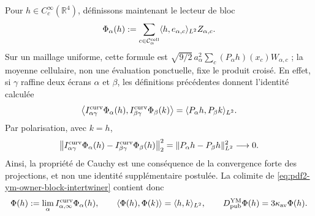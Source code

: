 Pour $h\in C_c^\infty(\mathbb R^4)$, définissons maintenant le lecteur de bloc
\begin{equation}\label{eq:pdf2-ym-owner-smeared-witness}
 \Phi_\alpha(h):=
 \sum_{c\in\mathcal C_\alpha^{\rm cell}}
 \langle h,e_{\alpha,c}\rangle_{L^2}Z_{\alpha,c}.
\end{equation}
Sur un maillage uniforme, cette formule est
$\sqrt{9/2}\,a_\alpha^2\sum_c(P_\alpha h)(x_c)W_{\alpha,c}$ ; la moyenne cellulaire,
non une évaluation ponctuelle, fixe le produit croisé. En effet, si $\gamma$ raffine
deux écrans $\alpha$ et $\beta$, les définitions précédentes donnent l’identité
calculée
\begin{equation}\label{eq:pdf2-ym-owner-smeared-cross-gram}
 \left\langle
  I_{\alpha\gamma}^{\rm curv}\Phi_\alpha(h),
  I_{\beta\gamma}^{\rm curv}\Phi_\beta(k)
 \right\rangle
 =\langle P_\alpha h,P_\beta k\rangle_{L^2}.
\end{equation}
Par polarisation, avec $k=h$,
\begin{equation}\label{eq:pdf2-ym-owner-smeared-cauchy-derived}
 \left\|
  I_{\alpha\gamma}^{\rm curv}\Phi_\alpha(h)
  -I_{\beta\gamma}^{\rm curv}\Phi_\beta(h)
 \right\|_2^2
 =\|P_\alpha h-P_\beta h\|_{L^2}^2\longrightarrow0.
\end{equation}
Ainsi, la propriété de Cauchy est une conséquence de la convergence forte des
projections, et non une identité supplémentaire postulée. La colimite de
\eqref{eq:pdf2-ym-owner-block-intertwiner} contient donc
\begin{equation}\label{eq:pdf2-ym-owner-smeared-gram}
 \Phi(h):=\lim_\alpha I_{\alpha,\infty}^{\rm curv}\Phi_\alpha(h),
 \qquad
 \langle\Phi(h),\Phi(k)\rangle=\langle h,k\rangle_{L^2},
 \qquad
 D_{\rm pub}^{\rm YM}\Phi(h)=3\kappa_{\rm av}\Phi(h).
\end{equation}


